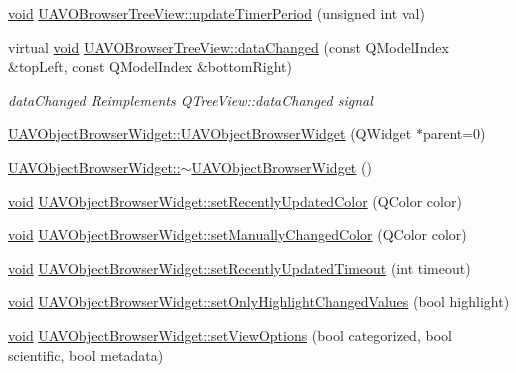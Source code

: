 \begin{DoxyCompactItemize}
\hyperlink{group___u_a_v_objects_plugin_ga444cf2ff3f0ecbe028adce838d373f5c}{void} \hyperlink{group___u_a_v_object_browser_plugin_ga9a903a75f0eb4f7b88c87dc948d8f63a}{\-U\-A\-V\-O\-Browser\-Tree\-View\-::update\-Timer\-Period} (unsigned int val)
\item 
virtual \hyperlink{group___u_a_v_objects_plugin_ga444cf2ff3f0ecbe028adce838d373f5c}{void} \hyperlink{group___u_a_v_object_browser_plugin_ga854dce00ee3378eb2fc1414eaaaf2a00}{\-U\-A\-V\-O\-Browser\-Tree\-View\-::data\-Changed} (const \-Q\-Model\-Index \&top\-Left, const \-Q\-Model\-Index \&bottom\-Right)
\begin{DoxyCompactList}\small\item\em data\-Changed \-Reimplements \-Q\-Tree\-View\-::data\-Changed signal \end{DoxyCompactList}\item 
\hyperlink{group___u_a_v_object_browser_plugin_ga403353bfa1860704e97addda60292b5d}{\-U\-A\-V\-Object\-Browser\-Widget\-::\-U\-A\-V\-Object\-Browser\-Widget} (\-Q\-Widget $\ast$parent=0)
\item 
\hyperlink{group___u_a_v_object_browser_plugin_gacff305183afd2168e382970b086cf108}{\-U\-A\-V\-Object\-Browser\-Widget\-::$\sim$\-U\-A\-V\-Object\-Browser\-Widget} ()
\item 
\hyperlink{group___u_a_v_objects_plugin_ga444cf2ff3f0ecbe028adce838d373f5c}{void} \hyperlink{group___u_a_v_object_browser_plugin_gae78918a99387bda266b432b5ded9168e}{\-U\-A\-V\-Object\-Browser\-Widget\-::set\-Recently\-Updated\-Color} (\-Q\-Color color)
\item 
\hyperlink{group___u_a_v_objects_plugin_ga444cf2ff3f0ecbe028adce838d373f5c}{void} \hyperlink{group___u_a_v_object_browser_plugin_gaee39097c4bce5dcff47148b0bf22f9e7}{\-U\-A\-V\-Object\-Browser\-Widget\-::set\-Manually\-Changed\-Color} (\-Q\-Color color)
\item 
\hyperlink{group___u_a_v_objects_plugin_ga444cf2ff3f0ecbe028adce838d373f5c}{void} \hyperlink{group___u_a_v_object_browser_plugin_ga7c8fdd1c763ccc45089b7b7158f49630}{\-U\-A\-V\-Object\-Browser\-Widget\-::set\-Recently\-Updated\-Timeout} (int timeout)
\item 
\hyperlink{group___u_a_v_objects_plugin_ga444cf2ff3f0ecbe028adce838d373f5c}{void} \hyperlink{group___u_a_v_object_browser_plugin_ga964995701170a95cc21eb78fb25acb9d}{\-U\-A\-V\-Object\-Browser\-Widget\-::set\-Only\-Highlight\-Changed\-Values} (bool highlight)
\item 
\hyperlink{group___u_a_v_objects_plugin_ga444cf2ff3f0ecbe028adce838d373f5c}{void} \hyperlink{group___u_a_v_object_browser_plugin_ga21f21843b8cf0310d7cac16dbb79846c}{\-U\-A\-V\-Object\-Browser\-Widget\-::set\-View\-Options} (bool categorized, bool scientific, bool metadata)

\end{DoxyCompactItemize}
